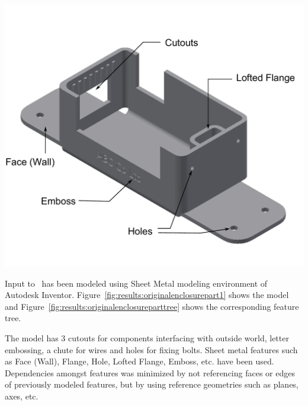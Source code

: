 \begin{minipage}{\linewidth}
\begin{minipage}[c]{0.62\linewidth}
\includegraphics[width=\linewidth,valign=t]{../Common/images/SheetMetal_Medium_Enclosure_OriginalPart_2}
 \label{fig:results:originalenclosurepart1}

Input to \mysystemname~has been modeled using Sheet Metal modeling environment of Autodesk Inventor. Figure~\ref{fig:results:originalenclosurepart1} shows the model and Figure~\ref{fig:results:originalenclosureparttree} shows the corresponding feature tree.

The model has 3 cutouts for components interfacing with outside world, letter embossing, a chute for wires and holes for fixing bolts. Sheet metal features such as Face (Wall), Flange, Hole, Lofted Flange, Emboss, etc. have been used. Dependencies amongst features was minimized by not referencing faces or edges of previously modeled features, but by using reference geometries such as planes, axes, etc. 


\end{minipage}
\end{minipage}
